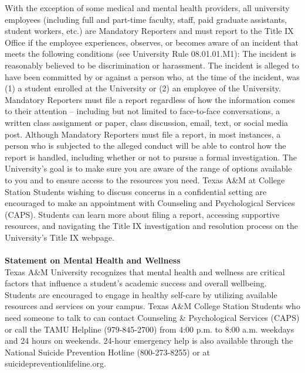 \documentclass[letterpaper,10pt]{report}
\begin{document}
With	the	exception	of	some	medical	and	mental	health	providers,	all	university	employees	(including	full	
and	part-time	faculty,	staff,	paid	graduate	assistants,	student	workers,	etc.)	are	Mandatory	Reporters	and	
must	report	to	the	Title	IX	Office	if	the	employee	experiences,	observes,	or	becomes	aware	of	an	incident	
that	meets	the	following	conditions (see	University	Rule	08.01.01.M1):
The	incident	is	reasonably	believed	to	be	discrimination	or	harassment.
The	incident	is	alleged	to	have	been	committed	by	or	against	a	person	who,	at	the	time	of	the	incident,	
was	(1)	a	student	enrolled	at	the	University	or	(2)	an	employee	of	the	University.
Mandatory	 Reporters	 must	 file	 a	 report	 regardless	 of	 how	 the	 information	 comes	 to	 their	 attention	 –
including	 but	 not	 limited	 to	 face-to-face	 conversations,	 a	 written	 class	 assignment	 or	 paper,	 class	
discussion,	email,	 text,	 or	 social	media	 post.	Although	Mandatory	 Reporters	must	 file	a	 report,	in	most	
instances,	 a	 person	 who	 is	 subjected	 to	 the	 alleged	 conduct	 will	 be	 able	 to	 control	 how	 the	 report	 is	
handled,	including	whether	or	not	to	pursue	a	formal	investigation.	The	University’s	goal	is	to	make	sure	
you	are	aware	of	the	range	of	options	available	to	you	and	to	ensure	access	to	the	resources	you	need.
Texas	A\&M	at	College	Station
Students	wishing	 to	 discuss	 concerns	in	a	 confidential	 setting	are	encouraged	 to	make	an	appointment	
with	Counseling	and	Psychological	Services (CAPS).
Students	can	learn	more	about	filing	a	report,	accessing	supportive	resources,	and	navigating	the	Title	IX	
investigation	and	resolution	process	on	the	University’s	Title	IX	webpage.	\\
\:\
\\
\textbf{Statement	on	Mental	Health	and	Wellness}\\
Texas	 A\&M	 University	 recognizes	 that	 mental	 health	 and	 wellness	 are	 critical	 factors	 that	 influence	 a	
student’s	academic	success	and	overall	wellbeing.	Students	are	encouraged	to	engage	in	healthy	self-care	
by	utilizing	available	resources	and	services	on	your	campus.
Texas	A\&M	College	Station
Students	who	need	someone	to	talk	to	can	contact	Counseling	\&	Psychological	Services (CAPS)	or	call	the	
TAMU	Helpline (979-845-2700)	from	4:00	p.m.	to	8:00	a.m.	weekdays	and	24	hours	on	weekends.	24-hour	
emergency help	 is	 also	 available	 through	 the	 National	 Suicide	 Prevention	 Hotline	 (800-273-8255)	 or	 at	
suicidepreventionlifeline.org.	\\
\:\
\\
\end{document}
